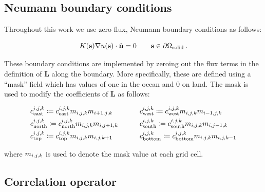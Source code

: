 \subsection{Neumann boundary conditions}
\label{ssec:boundary_conditions}

Throughout this work we use zero flux, Neumann boundary conditions as follows:
\begin{linenomath*}\begin{equation*}
    K(\mathbf{s})\nabla u(\mathbf{s}) \cdot \hat{\mathbf{n}} = 0 \qquad \mathbf{s}\in\partial\Omega_{\text{solid}} \, .
\end{equation*}\end{linenomath*}
These boundary conditions are implemented by zeroing out the flux terms in the
definition of $\mathbf{L}$ along the boundary.
More specifically, these are defined using a ``mask'' field which has
values of one in the ocean and 0 on land.
The mask is used to modify the coefficients of $\mathbf{L}$ as follows:
\begin{linenomath*}\begin{equation*}
    \begin{aligned}
        &c_\text{east}^{i,j,k} \coloneqq c_\text{east}^{i,j,k}
            m_{{i,j,k}} m_{{i+1,j,k}}
        \qquad
        &&c_\text{west}^{i,j,k} \coloneqq c_\text{west}^{i,j,k}
            m_{{i,j,k}} m_{{i-1,j,k}}
        \\
        &c_\text{north}^{i,j,k} \coloneqq c_\text{north}^{i,j,k}
            m_{{i,j,k}} m_{{i,j+1,k}}
        \qquad
        &&c_\text{south}^{i,j,k} \coloneqq c_\text{south}^{i,j,k}
            m_{{i,j,k}} m_{{i,j-1,k}}
        \\
        &c_\text{top}^{i,j,k} \coloneqq c_\text{top}^{i,j,k}
            m_{{i,j,k}} m_{{i,j,k+1}}
        \qquad
        &&c_\text{bottom}^{i,j,k} \coloneqq c_\text{bottom}^{i,j,k}
            m_{{i,j,k}} m_{{i,j,k-1}}
    \end{aligned}
\end{equation*}\end{linenomath*}
where $m_{{i,j,k}}$ is used to denote the mask value at each grid cell.

\subsection{Correlation operator}
\label{ssec:correlation_fv}

